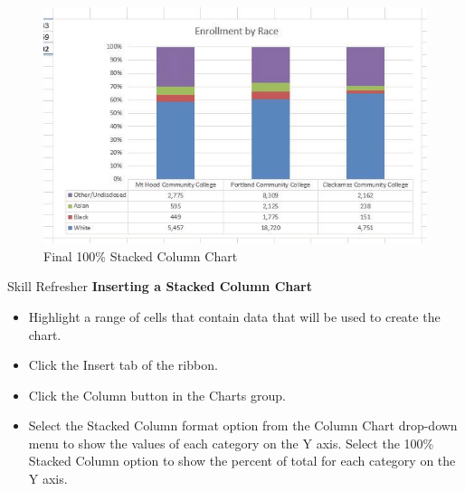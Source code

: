 \begin{figure}[H]
	\centering
	\includegraphics[width=\maxwidth{.95\linewidth}]{gfx/ch04_fig26}
	\caption{Final 100\% Stacked Column Chart}
	\label{04:fig26}
\end{figure}

\begin{center}
	\begin{sklbox}{Skill Refresher}
		\textbf{Inserting a Stacked Column Chart}
		\\
		\begin{itemize}
			\setlength{\itemsep}{0pt}
			\setlength{\parskip}{0pt}
			\setlength{\parsep}{0pt}

			\item Highlight a range of cells that contain data that will be used to create the chart.
			\item Click the Insert tab of the ribbon.
			\item Click the Column button in the Charts group.
			\item Select the Stacked Column format option from the Column Chart drop-down menu to show the values of each category on the Y axis. Select the 100\% Stacked Column option to show the percent of total for each category on the Y axis.
			
		\end{itemize}
	\end{sklbox}
\end{center}

